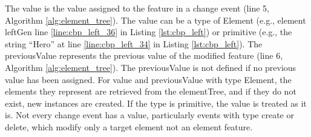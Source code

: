 The \textsf{value} is the value assigned to the feature in a change event (line 5, Algorithm \ref{alg:element_tree}). The \textsf{value} can be a type of \textsf{Element} (e.g., element \textsf{leftGen} line \ref{line:cbp_left_36} in Listing \ref{lst:cbp_left}) or primitive (e.g., the string “Hero” at line \ref{line:cbp_left_34} in Listing \ref{lst:cbp_left}). The \textsf{previousValue} represents the previous value of the modified feature (line 6, Algorithm \ref{alg:element_tree}). The \textsf{previousValue} is not defined if no previous value has been assigned. For \textsf{value} and \textsf{previousValue} with type \textsf{Element}, the elements they represent are retrieved from the \textsf{elementTree}, and if they do not exist, new instances are created. If the type is primitive, the value is treated as it is. Not every change event has a \textsf{value}, particularly events with type \textsf{create}
or \textsf{delete}, which modify only a target element not an element feature.


